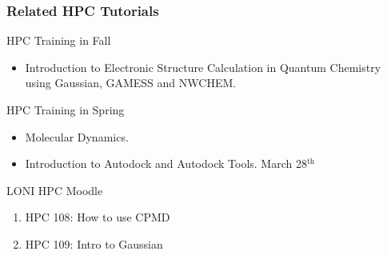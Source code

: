\documentclass[slidestop,mathserif,compress,xcolor=svgnames]{beamer}
\newenvironment{eblock}[0]
{
\begin{beamerboxesrounded}[upper=uppercol2,lower=lowercol2,shadow=true]}
{\end{beamerboxesrounded}}
\begin{document}
\begin{frame}
  \frametitle{\small Related HPC Tutorials}
  \begin{eblock}{HPC Training in Fall}
    \begin{itemize}
    \item Introduction to Electronic Structure Calculation in Quantum Chemistry using Gaussian, GAMESS and NWCHEM.
    \end{itemize}
  \end{eblock}
  \begin{eblock}{HPC Training in Spring}
    \begin{itemize}
    \item Molecular Dynamics.
    \item Introduction to Autodock and Autodock Tools. March 28$^\mathrm{th}$
    \end{itemize}
  \end{eblock}
  \begin{eblock}{LONI HPC Moodle}
    \begin{enumerate}
      \item HPC 108: How to use CPMD
      \item HPC 109: Intro to Gaussian
    \end{enumerate}
  \end{eblock}
\end{frame}
\end{document}
